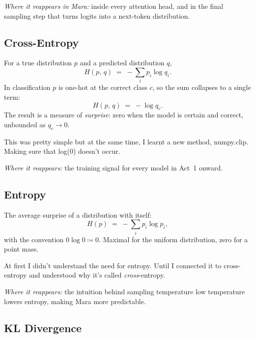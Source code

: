 \documentclass[11pt,a4paper]{article}
\begin{document}
\medskip
\noindent\emph{Where it reappears in Mara:} inside every attention head, and
in the final sampling step that turns logits into a next-token distribution.

\subsection{Cross-Entropy}
\label{subsec:cross-entropy}

For a true distribution $p$ and a predicted distribution $q$,
\[
  H(p,\, q) \;=\; -\sum_{i} p_{i} \log q_{i}.
\]
In classification $p$ is one-hot at the correct class $c$, so the sum
collapses to a single term:
\[
  H(p,\, q) \;=\; -\log q_{c}.
\]
The result is a measure of \emph{surprise}: zero when the model is certain
and correct, unbounded as $q_{c} \to 0$.

This was pretty simple but at the same time, I learnt a new method, numpy.clip. Making sure that log(0) doesn't occur.

\medskip
\noindent\emph{Where it reappears:} the training signal for every model in
Act~1 onward.

\subsection{Entropy}
\label{subsec:entropy}

The average surprise of a distribution with itself:
\[
  H(p) \;=\; -\sum_{i} p_{i} \log p_{i},
\]
with the convention $0 \log 0 \coloneqq 0$.
Maximal for the uniform distribution, zero for a point mass.

At first I didn't understand the need for entropy. Until I connected it to cross-entropy and understood why it's called \textit{cross}-entropy.

\medskip
\noindent\emph{Where it reappears:} the intuition behind sampling
temperature \textemdash{} low temperature lowers entropy, making Mara more
predictable.

\subsection{KL Divergence}
\label{subsec:kl-divergence}
\end{document}
